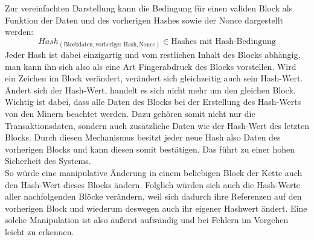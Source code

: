 Zur vereinfachten Darstellung kann die Bedingung für einen validen Block als Funktion der Daten und des vorherigen Hashes sowie der Nonce dargestellt werden:
\[Hash_{(\text{Blockdaten}, \text{vorheriger Hash}, \text{Nonce})}\in \text{Hashes mit Hash-Bedingung}\]
Jeder Hash ist dabei einzigartig und vom restlichen Inhalt des Blocks abhängig, man kann ihn sich also als eine Art Fingerabdruck des Blocks vorstellen. Wird ein Zeichen im Block verändert, verändert sich gleichzeitig auch sein Hash-Wert. Ändert sich der Hash-Wert, handelt es sich nicht mehr um den gleichen Block. Wichtig ist dabei, dass alle Daten des Blocks bei der Erstellung des Hash-Werts von den Minern beachtet werden. Dazu gehören somit nicht nur die Transaktionsdaten, sondern auch zusätzliche Daten wie der Hash-Wert des letzten Blocks. Durch diesen Mechanismus besitzt jeder neue Hash also Daten des vorherigen Blocks und kann diesen somit bestätigen. Das führt zu einer hohen Sicherheit des Systems.\\
So würde eine manipulative Änderung in einem beliebigen Block der Kette auch den Hash-Wert dieses Blocks ändern. Folglich würden sich auch die Hash-Werte aller nachfolgenden Blöcke verändern, weil sich dadurch ihre Referenzen auf den vorherigen Block und wiederum deswegen auch ihr eigener Hashwert ändert. Eine solche Manipulation ist also äußerst aufwändig und bei Fehlern im Vorgehen leicht zu erkennen.